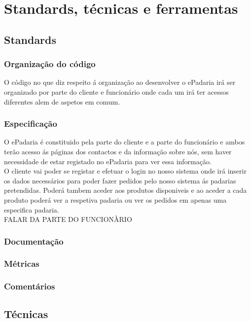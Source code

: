 \chapter{Standards, técnicas e ferramentas}
\label{standards_tecnicas_ferramentas}

\section{Standards}
\subsection{Organização do código}
O código no que diz respeito á organização ao desenvolver o ePadaria irá ser organizado por parte do cliente e funcionário onde cada um irá ter acessos diferentes alem de aspetos em comum.
\subsection{Especificação}
O ePadaria é constituido pela parte do cliente e a parte do funcionário e ambos terão acesso ás páginas dos contactos e da informação sobre nós, sem haver necessidade de estar registado no ePadaria para ver essa informação.\\
O cliente vai poder se registar e efetuar o login no nosso sistema onde irá inserir os dados necessários para poder fazer pedidos pelo nosso sistema ás padarias pretendidas. Poderá tambem aceder aos produtos disponiveis e ao aceder a cada produto poderá ver a respetiva padaria ou ver os pedidos em apenas uma especifica padaria. \\
FALAR DA PARTE DO FUNCIONÀRIO

\subsection{Documentação}
\subsection{Métricas}
\subsection{Comentários}

\section{Técnicas}

